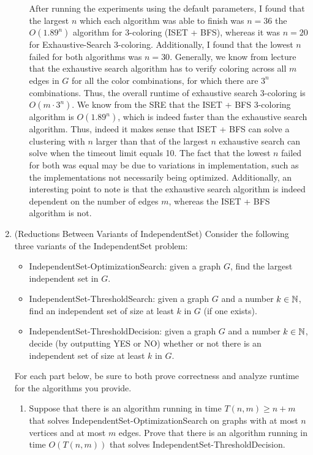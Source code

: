 \documentclass[11pt]{article}
\begin{document}
\begin{enumerate}
\begin{enumerate}
    After running the experiments using the default parameters, I found that the largest $n$ which each algorithm was able to finish was $n=36$ the $O(1.89^n)$ algorithm for 3-coloring (ISET + BFS), whereas it was $n=20$ for Exhaustive-Search 3-coloring. Additionally, I found that the lowest $n$ failed for both algorithms was $n=30$. Generally, we know from lecture that the exhaustive search algorithm has to verify coloring across all $m$ edges in $G$ for all the color combinations, for which there are $3^n$ combinations. Thus, the overall runtime of exhaustive search 3-coloring is $O(m \cdot 3^n)$. We know from the SRE that the ISET + BFS 3-coloring algorithm is $O(1.89^n)$, which is indeed faster than the exhaustive search algorithm. Thus, indeed it makes sense that ISET + BFS can solve a clustering with $n$ larger than that of the largest $n$ exhaustive search can solve when the timeout limit equals 10. The fact that the lowest $n$ failed for both was equal may be due to variations in implementation, such as the implementations not necessarily being optimized. Additionally, an interesting point to note is that the exhaustive search algorithm is indeed dependent on the number of edges $m$, whereas the ISET + BFS algorithm is not. 
  \end{enumerate}

 \item (Reductions Between Variants of IndependentSet) 
 Consider the following three variants of the IndependentSet problem:
 \begin{itemize}
     \item IndependentSet-OptimizationSearch: given a graph $G$, find the largest independent set in $G$.
     \item IndependentSet-ThresholdSearch: given a graph $G$ and a number $k\in \mathbb{N}$, find an independent set of size at least $k$ in $G$ (if one exists).
     \item IndependentSet-ThresholdDecision: given a graph $G$ and a number $k\in \mathbb{N}$, decide (by outputting YES or NO) whether or not there is an independent set of size at least $k$ in $G$. 
 \end{itemize}
For each part below, be sure to both prove correctness and analyze runtime for the algorithms you provide.

 \begin{enumerate}
 \item Suppose that there is an algorithm running in time $T(n,m)\geq n+m$ that solves IndependentSet-OptimizationSearch on graphs with at most $n$ vertices and at most $m$ edges.  Prove that there is an algorithm running in time $O(T(n,m))$ that solves IndependentSet-ThresholdDecision. \\


\end{enumerate}
\end{enumerate}
\end{document}

